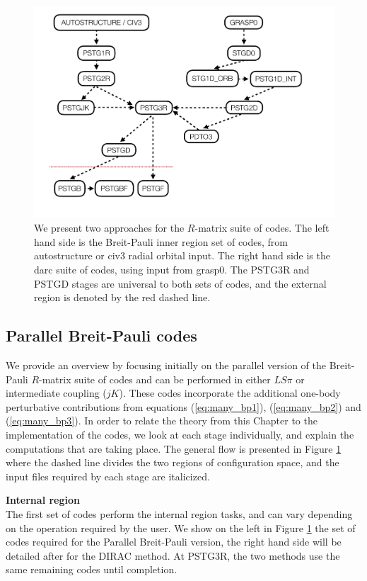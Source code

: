 \begin{figure}[h]
\centering
\includegraphics[scale=0.54]{Figures/r-matrix/code_flow.pdf}
\caption{We present two approaches for the $R$-matrix suite of codes. The left hand side is the Breit-Pauli inner region set of codes, from {\sc autostructure} or {\sc civ3} radial orbital input. The right hand side is the {\sc darc} suite of codes, using input from {\sc grasp0}. The PSTG3R and PSTGD stages are universal to both sets of codes, and the external region is denoted by the red dashed line. \label{fig:rmat_flow}}
\end{figure}

\subsection{Parallel Breit-Pauli codes}\label{ssec:BP}
We provide an overview by focusing initially on the parallel version of the Breit-Pauli $R$-matrix suite of codes and can be performed in either $LS\pi$ or intermediate coupling ($jK$). These codes incorporate the additional one-body perturbative contributions from equations (\ref{eq:many_bp1}), (\ref{eq:many_bp2}) and (\ref{eq:many_bp3}). In order to relate the theory from this Chapter to the implementation of the codes, we look at each stage individually, and explain the computations that are taking place. The general flow is presented in Figure \ref{fig:rmat_flow} where the dashed line divides the two regions of configuration space, and the input files required by each stage are italicized. 

\protect\textbf{Internal region}\\
The first set of codes perform the internal region tasks, and can vary depending on the operation required by the user. We show on the left in Figure \ref{fig:rmat_flow} the set of codes required for the Parallel Breit-Pauli version, the right hand side will be detailed after for the DIRAC method. At PSTG3R, the two methods use the same remaining codes until completion.

